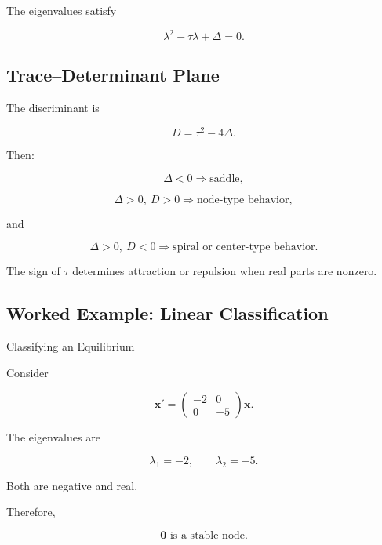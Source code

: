 The eigenvalues satisfy

\[
\boxed{
\lambda^2
-
\tau\lambda
+
\Delta
=
0.
}
\]

\subsection{Trace--Determinant Plane}
\label{subsec:trace-determinant-plane}

The discriminant is

\[
\boxed{
D
=
\tau^2-4\Delta.
}
\]

Then:

\[
\boxed{
\Delta<0
\Rightarrow
\text{saddle},
}
\]

\[
\boxed{
\Delta>0,\ D>0
\Rightarrow
\text{node-type behavior},
}
\]

and

\[
\boxed{
\Delta>0,\ D<0
\Rightarrow
\text{spiral or center-type behavior}.
}
\]

The sign of \(\tau\) determines attraction or repulsion when real parts
are nonzero.

\subsection{Worked Example: Linear Classification}
\label{subsec:worked-linear-classification}

\begin{workedexamplebox}{Classifying an Equilibrium}

Consider

\[
\mathbf{x}'
=
\begin{pmatrix}
-2&0\\
0&-5
\end{pmatrix}
\mathbf{x}.
\]

The eigenvalues are

\[
\lambda_1=-2,
\qquad
\lambda_2=-5.
\]

Both are negative and real.

Therefore,

\begin{answerbox}
\[
\boxed{
\mathbf{0}
\text{ is a stable node}.
}
\]
\end{answerbox}

\end{workedexamplebox}

